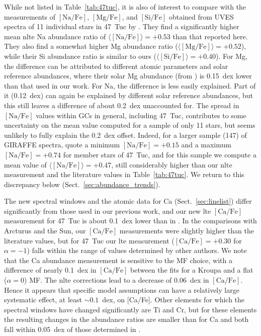 \documentclass{aa}
\begin{document}
While not listed in Table~\ref{tab:47tuc}, it is also of interest to compare with the measurements of $\mathrm{[Na/Fe]}$, $\mathrm{[Mg/Fe]}$, and $\mathrm{[Si/Fe]}$ obtained from UVES spectra of 11 individual stars in 47~Tuc by . They find a significantly higher mean \ac{nlte} Na abundance ratio of $\langle\mathrm{[Na/Fe]}\rangle = +0.53$ than that reported here. They also find a somewhat higher Mg abundance ratio ($\langle\mathrm{[Mg/Fe]}\rangle=+0.52$), while their Si abundance ratio is similar to ours ($\langle\mathrm{[Si/Fe]}\rangle=+0.40$). For Mg, the difference can be attributed to different atomic parameters and solar reference abundances, where their solar Mg abundance (from \citealt{Gratton2003a}) is 0.15~dex lower than that used in our work. For Na, the difference is less easily explained. Part of it (0.12~dex) can again be explained by different solar reference abundances, but this still leaves a difference of about 0.2~dex unaccounted for. The spread in $\mathrm{[Na/Fe]}$ values within GCs in general, including 47~Tuc, contributes to some uncertainty on the mean value computed for a sample of only 11 stars, but seems unlikely to fully explain the 0.2~dex offset. Indeed, for a larger sample (147) of GIRAFFE spectra, \citet{Carretta2009a} quote a minimum $\mathrm{[Na/Fe]}=+0.15$ and a maximum $\mathrm{[Na/Fe]}=+0.74$ for member stars of 47~Tuc, and for this sample we compute a mean value of $\langle\mathrm{[Na/Fe]}\rangle=+0.47$, still considerably higher than our \ac{nlte} measurement and the literature values in Table~\ref{tab:47tuc}. We return to this discrepancy below (Sect.~\ref{sec:abundance_trends}). 

The new spectral windows and the atomic data for Ca (Sect.~\ref{sec:linelist}) differ significantly from those used in our previous work, and our new \ac{lte} $\mathrm{[Ca/Fe]}$ measurement for 47~Tuc is about 0.1~dex lower than in . 
In the comparisons with Arcturus and the Sun, our $\mathrm{[Ca/Fe]}$ measurements were slightly higher than the literature values, but for 47~Tuc our \ac{lte} measurement ($\mathrm{[Ca/Fe]}=+0.30$ for $\alpha=-1$) falls within the range of values determined by other authors. 
We note that the Ca abundance measurement is sensitive to the MF choice, with a difference of nearly 0.1~dex in $\mathrm{[Ca/Fe]}$ between the fits for a Kroupa and a flat ($\alpha=0$) MF. 
The \ac{nlte} corrections lead to a decrease of 0.06~dex in $\mathrm{[Ca/Fe]}$.
Hence it appears that specific model assumptions can have a relatively large systematic effect, at least $\sim0.1$~dex, on [Ca/Fe].
Other elements for which the spectral windows have changed significantly are Ti and Cr, but for these elements the resulting changes in the abundance ratios are smaller than for Ca and both fall within 0.05~dex of those determined in . 
\end{document}
